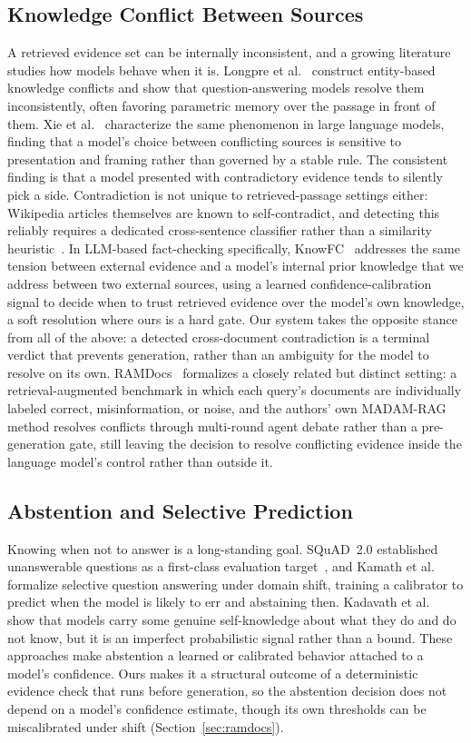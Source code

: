 \documentclass[conference]{IEEEtran}
\begin{document}
\subsection{Knowledge Conflict Between Sources}
A retrieved evidence set can be internally inconsistent, and a growing
literature studies how models behave when it is. Longpre et
al.~\cite{longpre2021conflict} construct entity-based knowledge conflicts and
show that question-answering models resolve them inconsistently, often
favoring parametric memory over the passage in front of them. Xie et
al.~\cite{xie2024conflict} characterize the same phenomenon in large language
models, finding that a model's choice between conflicting sources is
sensitive to presentation and framing rather than governed by a stable rule.
The consistent finding is that a model presented with contradictory evidence
tends to silently pick a side. Contradiction is not unique to
retrieved-passage settings either: Wikipedia articles themselves are known
to self-contradict, and detecting this reliably requires a dedicated
cross-sentence classifier rather than a similarity
heuristic~\cite{hsu2021wikicontradiction}. In LLM-based fact-checking
specifically, KnowFC~\cite{zhang2026knowfc} addresses the same tension
between external evidence and a model's internal prior knowledge that we
address between two external sources, using a learned confidence-calibration
signal to decide when to trust retrieved evidence over the model's own
knowledge, a soft resolution where ours is a hard gate. Our system takes the
opposite stance from all of the above: a
detected cross-document contradiction is a terminal verdict that prevents
generation, rather than an ambiguity for the model to resolve on its own.
RAMDocs~\cite{wang2025ramdocs} formalizes a closely related but distinct
setting: a retrieval-augmented benchmark in which each query's documents
are individually labeled correct, misinformation, or noise, and the
authors' own MADAM-RAG method resolves conflicts through multi-round agent
debate rather than a pre-generation gate, still leaving the decision to
resolve conflicting evidence inside the language model's control rather
than outside it.
\subsection{Abstention and Selective Prediction}
Knowing when not to answer is a long-standing goal. SQuAD~2.0 established
unanswerable questions as a first-class evaluation
target~\cite{rajpurkar2018squad2}, and Kamath et al.~\cite{kamath2020selective}
formalize selective question answering under domain shift, training a
calibrator to predict when the model is likely to err and abstaining then.
Kadavath et al.~\cite{kadavath2022language} show that models carry
some genuine self-knowledge about what they do and do not know, but it is an
imperfect probabilistic signal rather than a bound. These approaches make
abstention a learned or calibrated behavior attached to a model's
confidence. Ours makes it a structural outcome of a deterministic
evidence check that runs before generation, so the abstention decision does
not depend on a model's confidence estimate, though its own thresholds can
be miscalibrated under shift (Section~\ref{sec:ramdocs}).
\end{document}
